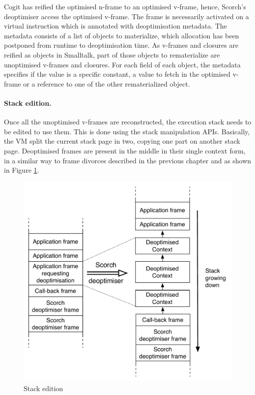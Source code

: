 \documentclass[a4paper,12pt,twoside]{../includes/ThesisStyle}
\begin{document}
Cogit has reified the optimised n-frame to an optimised v-frame, hence, Scorch's deoptimiser access the optimised v-frame. The frame is necessarily activated on a virtual instruction which is annotated with deoptimisation metadata. The metadata consists of a list of objects to materialize, which allocation has been postponed from runtime to deoptimisation time. As v-frames and closures are reified as objects in Smalltalk, part of those objects to rematerialize are unoptimised v-frames and closures. For each field of each object, the metadata specifies if the value is a specific constant, a value to fetch in the optimised v-frame or a reference to one of the other rematerialized object.

\paragraph{Stack edition.}

Once all the unoptimised v-frames are reconstructed, the execution stack needs to be edited to use them. This is done using the stack manipulation APIs. Basically, the VM split the current stack page in two, copying one part on another stack page. Deoptimised frames are present in the middle in their single context form, in a similar way to frame divorces described in the previous chapter and as shown in Figure \ref{fig:DeoptStacks}.

\begin{figure}[h!]
    \begin{center}
		\includegraphics[width=0.80\linewidth]{DeoptStacks}
        \caption{Stack edition}
        \label{fig:DeoptStacks}
    \end{center}
\end{figure}
\end{document}
